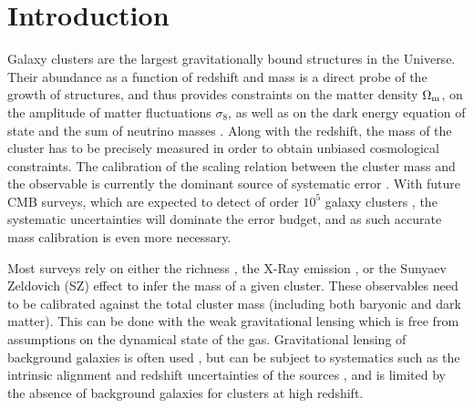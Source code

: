 \documentclass[prd, superscriptaddress, tightenlines, longbibliography, nofootinbib, eqsecnum, amsfonts, amsmath, floatfix, twocolumn, notitlepage]{revtex4-2}
\begin{document}

   \maketitle

\tableofcontents
\section{Introduction}
\setcounter{footnote}{0}

Galaxy clusters are the largest gravitationally bound structures in the Universe. Their abundance as a function of redshift and mass is a direct probe of the growth of structures, and thus provides constraints on the matter density $\Omega_{\rm m}$, on the amplitude of matter fluctuations $\sigma_8$, as well as on the dark energy equation of state and the sum of neutrino masses \cite{Vikhlinin:2008ym,Sehgal:2010ca,Allen:2011zs,Planck:2013lkt, Mantz:2014xba,Mantz:2014paa, Planck:2015lwi,SPT:2016izt, SPT:2018njh}. Along with the redshift, the mass of the cluster has to be precisely measured in order to obtain unbiased cosmological constraints. The calibration of the scaling relation between the cluster mass and the observable is currently the dominant source of systematic error \cite{Pratt:2019cnf, Salvati:2020exw, Salvati:2021gkt}. With future CMB surveys, which are expected to detect of order $10^5$ galaxy clusters \cite{Madhavacheril:2017onh, SimonsObservatory:2018koc, CMB-S4:2016ple}, the systematic uncertainties will dominate the error budget, and as such accurate mass calibration is even more necessary.

Most surveys rely on either the richness \cite[e.g.][]{Koester:2007bj,DES:2015mqu,Andreon:2016eck, Farahi:2016xux,Simet:2016mzg}, the X-Ray emission \cite[e.g.][]{Arnaud:2005ur, Arnaud:2007br, Vikhlinin:2008ym}, or the Sunyaev Zeldovich (SZ) effect \cite[e.g.][]{Vanderlinde:2010eb, Planck:2013lkt,Planck:2015lwi} to infer the mass of a given cluster. These observables need to be calibrated against the total cluster mass (including both baryonic and dark matter). This can be done with the weak gravitational lensing which is free from assumptions on the dynamical state of the gas.
Gravitational lensing of background galaxies is often used \cite{vonderLinden:2014haa, Hoekstra:2015gda, Smith:2015qhs, Sereno:2017zcn, Penna-Lima:2016tvo, Bellagamba:2018gec,Miyatake:2018lpb, Umetsu:2020wlf}, but can be subject to systematics such as the intrinsic alignment and  redshift uncertainties of the sources \cite{Becker:2010xj}, and is limited by the absence of background galaxies for clusters at high redshift. 
\end{document}

